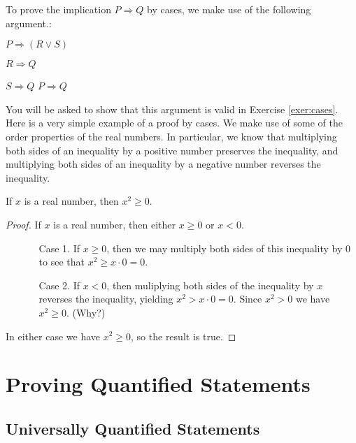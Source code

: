 To prove the implication $P\Rightarrow Q$ by cases, we make use of the following argument.: 

\setlength\linwid{5 em}
\begin{logarg}
\item $P\Rightarrow (R\lor S)$
\item $R\Rightarrow Q$
\item $S\Rightarrow Q$
\hence $P\Rightarrow Q$
\end{logarg}

You will be asked to show that this argument is valid in Exercise \ref{exer:cases}.
\smallbreak
Here is a very simple example of a proof by cases. We make use of some of the order properties of the real numbers. In particular, we know that multiplying both sides of an inequality by a positive number preserves the inequality, and multiplying both sides of an inequality by a negative number reverses the inequality.

\begin{thrm}\label{thrm:squares}
If $x$ is a real number, then $x^2\geq 0$.
\end{thrm}

\begin{proof}
If $x$ is a real number, then either $x\geq 0$ or $x<0$.
\begin{itemize}
\item[]
\begin{itemize}
\item[Case 1.] If $x\geq 0$, then we may multiply both sides of this inequality by $0$ to see that $x^2\geq x\cdot 0=0$.
\item[Case 2.] If $x<0$, then muliplying both sides of the inequality by $x$ reverses the inequality, yielding $x^2>x\cdot 0=0$. Since $x^2>0$ we have $x^2\geq0$. (Why?)
\end{itemize}
\end{itemize}
In either case we have $x^2\geq 0$, so the result is true.
\end{proof}

\section{Proving Quantified Statements}

\subsection{Universally Quantified Statements}

